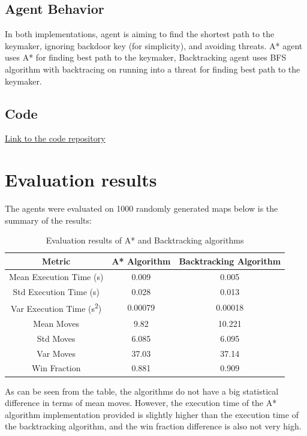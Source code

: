 \documentclass[12pt]{article}
\begin{document}
\subsection{Agent Behavior}
In both implementations, agent is aiming to find the shortest path to the
keymaker, ignoring backdoor key (for simplicity), and avoiding threats. A*
agent uses A* for finding best path to the keymaker, Backtracking agent uses
BFS algorithm with backtracing on running into a threat for finding best path
to the keymaker.

\subsection{Code}
\href{https://github.com/V1adych/itai_assignment_1}{Link to the code repository}

\section{Evaluation results}
The agents were evaluated on 1000 randomly generated maps below is the summary
of the results:
\begin{table}[H]
    \centering
    \begin{tabular}{|c|c|c|}
        \hline
        \textbf{Metric}                           & \textbf{A* Algorithm} & \textbf{Backtracking Algorithm} \\ \hline
        Mean Execution Time (s)                   & 0.009                 & 0.005                           \\ \hline
        Std Execution Time (s)                    & 0.028                 & 0.013                           \\ \hline
        Var Execution Time (s\textsuperscript{2}) & 0.00079               & 0.00018                         \\ \hline
        Mean Moves                                & 9.82                  & 10.221                          \\ \hline
        Std Moves                                 & 6.085                 & 6.095                           \\ \hline
        Var Moves                                 & 37.03                 & 37.14                           \\ \hline
        Win Fraction                              & 0.881                 & 0.909                           \\ \hline
    \end{tabular}
    \caption{Evaluation results of A* and Backtracking algorithms}
    \label{tab:evaluation_results}
\end{table}
\noindent
As can be seen from the table, the algorithms do not have a big
statistical difference in terms of mean moves. However, the execution time of the A* algorithm implementation provided is slightly higher than the execution time of the backtracking algorithm, and the win fraction difference is also not very high.
\end{document}
